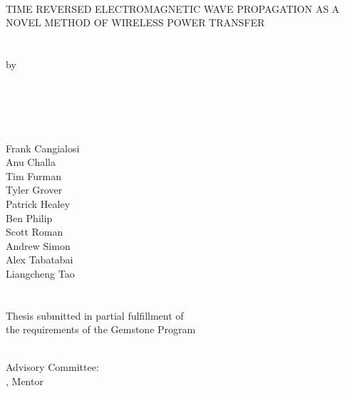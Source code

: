 \hbox{\ }
\vspace{0.5in}
\startSINGLEspacing
\begin{center}

\large{{TIME REVERSED ELECTROMAGNETIC WAVE PROPAGATION AS A \\
NOVEL METHOD OF WIRELESS POWER TRANSFER}}\\
\ \\
\ \\
\large{by} \\
\ \\
\large{\teamname}
\ \\
\ \\
\ \\
\ \\
\small\normalsize
Frank Cangialosi\\
Anu Challa\\
Tim Furman\\
Tyler Grover\\
Patrick Healey\\
Ben Philip\\
Scott Roman\\
Andrew Simon\\
Alex Tabatabai\\
Liangcheng Tao\\
\ \\ 
\ \\
Thesis submitted in partial fulfillment of \\ 
the requirements of the Gemstone Program\\
\Umd \\
\the\year
\end{center}

\vspace{7.5em}

\noindent Advisory Committee: \\
\mentor, Mentor
\discussantsEACHLINE
